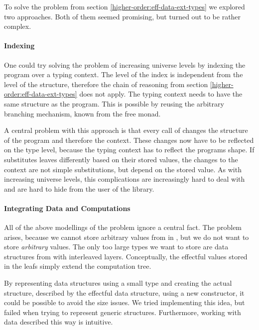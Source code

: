 To solve the problem from section \ref{higher-order:eff-data-ext-types} we
explored two approaches.
Both of them seemed promising, but turned out to be rather complex.

\paragraph{Indexing}
One could try solving the problem of increasing universe levels by indexing the
program over a typing context.
The level of the index is independent from the level of the structure, therefore
the chain of reasoning from section \ref{higher-order:eff-data-ext-types} does
not apply.
The typing context needs to have the same structure as the program.
This is possible by reusing the arbitrary branching mechanism, known from the
free monad.

A central problem with this approach is that every call of \AgdaFunction{>>=}
changes the structure of the program and therefore the context.
These changes now have to be reflected on the type level, because the typing
context has to reflect the programs shape.
If \AgdaFunction{>>=} substitutes leaves differently based on their stored
values, the changes to the context are not simple substitutions, but depend on
the stored value.
As with increasing universe levels, this complications are increasingly hard to
deal with and are hard to hide from the user of the library.

\paragraph{Integrating Data and Computations}
All of the above modellings of the problem ignore a central fact.
The problem arises, because we cannot store arbitrary values from
 in \AgdaSpace{}, but
we do not want to store \textit{arbitrary} values.
The only too large types we want to store are data structures from
 with interleaved
\AgdaSpace{} layers.
Conceptually, the effectful values stored in the leafs simply extend the
computation tree.

By representing data structures using a small type and creating the actual
structure, described by the effectful data structure, using a new
 constructor, it could be possible to avoid the size issues.
We tried implementing this idea, but failed when trying to represent generic
structures.
Furthermore, working with data described this way is intuitive.


